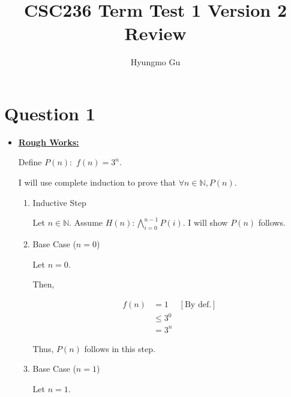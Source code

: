 \documentclass[12pt]{article}
\begin{document}
\title{CSC236 Term Test 1 Version 2 Review}
\author{Hyungmo Gu}
\maketitle

\section*{Question 1}
\begin{itemize}
    \item

    \begin{mdframed}
    \underline{\textbf{Rough Works:}}

    \bigskip
    \setcounter{equation}{0}

    Define $P(n):$ $f(n)=3^n$.

    \bigskip

    I will use complete induction to prove that $\forall n \in \mathbb{N}, P(n)$.

    \bigskip

    \begin{enumerate}[1.]
        \item Inductive Step

        \begin{mdframed}
        Let $n \in \mathbb{N}$. Assume $H(n):\bigwedge\limits_{i=0}^{n-1}P(i)$.
        I will show $P(n)$ follows.
        \end{mdframed}

        \item Base Case ($n = 0$)

        \begin{mdframed}
        Let $n = 0$.

        \bigskip

        Then,

        \begin{align}
            f(n) &= 1 & [\text{By def.}]\\
            &\leq 3^0\\
            &= 3^n
        \end{align}

        \bigskip

        Thus, $P(n)$ follows in this step.
        \end{mdframed}

        \item Base Case ($n = 1$)

        \begin{mdframed}
        Let $n = 1$.


\end{mdframed}
\end{enumerate}
\end{mdframed}
\end{itemize}
\end{document}
